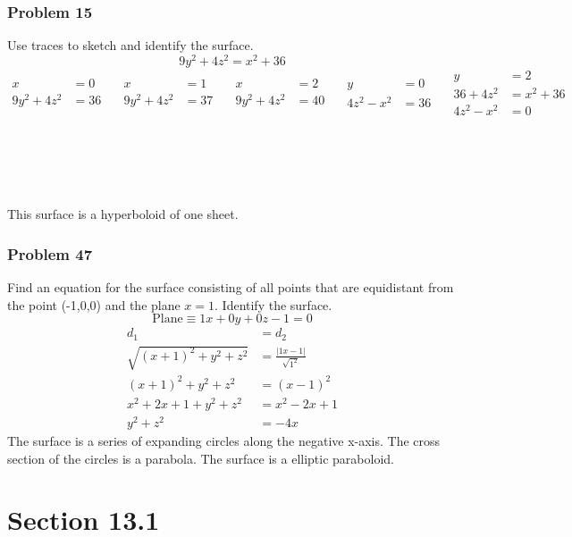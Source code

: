 \documentclass[letterpaper, 12pt]{math}
\begin{document}
\subsubsection*{Problem 15}
Use traces to sketch and identify the surface.
\[ 9y^2+4z^2 = x^2+36 \]
\[\begin{split}
  x &= 0 \\
  9y^2+4z^2 &= 36
\end{split}\quad
\begin{split}
  x &= 1 \\
  9y^2+4z^2 &= 37
\end{split}\quad
\begin{split}
  x &= 2 \\
  9y^2+4z^2 &= 40
\end{split}\quad
\begin{split}
  y &= 0 \\
  4z^2-x^2 &= 36
\end{split}\quad
\begin{split}
  y &= 2 \\
  36+4z^2 &= x^2+36 \\
  4z^2-x^2 &= 0
\end{split} \]
\\ \\ \\ \\ \\
This surface is a hyperboloid of one sheet.

\subsubsection*{Problem 47}
Find an equation for the surface consisting of all points that are
equidistant from the point (-1,0,0) and the plane \( x = 1 \). Identify the
surface.
\[ \text{Plane} \equiv 1x+0y+0z-1 = 0 \]
\begin{align*}
  d_1 &= d_2 \\
  \sqrt{(x+1)^2+y^2+z^2} &= \frac{|1x-1|}{\sqrt{1^2}} \\
  (x+1)^2+y^2+z^2 &= (x-1)^2 \\
  x^2+2x+1+y^2+z^2 &= x^2-2x+1 \\
  y^2+z^2 &= -4x
\end{align*}
The surface is a series of expanding circles along the negative x-axis. The
cross section of the circles is a parabola. The surface is a elliptic
paraboloid.

\section*{Section 13.1}
\end{document}
